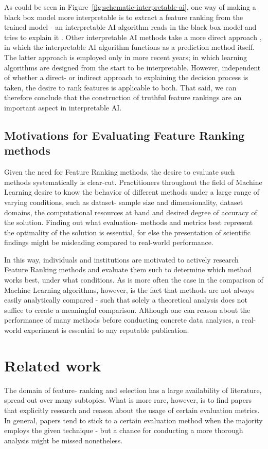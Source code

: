 \documentclass{article}
\begin{document}
As could be seen in Figure~\ref{fig:schematic-interpretable-ai}, one way of making a black box model more interpretable is to extract a feature ranking from the trained model - an interpretable AI algorithm reads in the black box model and tries to explain it \citep{lundberg_unified_2017}. Other interpretable AI methods take a more direct approach \citep{arik_tabnet_2020}, in which the interpretable AI algorithm functions as a prediction method itself. The latter approach is employed only in more recent years; in which learning algorithms are designed from the start to be interpretable. However, independent of whether a direct- or indirect approach to explaining the decision process is taken, the desire to rank features is applicable to both. That said, we can therefore conclude that the construction of truthful feature rankings are an important aspect in interpretable AI.

\subsection{Motivations for Evaluating Feature Ranking methods}
Given the need for Feature Ranking methods, the desire to evaluate such methods systematically is clear-cut. Practitioners throughout the field of Machine Learning desire to know the behavior of different methods under a large range of varying conditions, such as dataset- sample size and dimensionality, dataset domains, the computational resources at hand and desired degree of accuracy of the solution. Finding out what evaluation- methods and metrics best represent the optimality of the solution is essential, for else the presentation of scientific findings might be misleading compared to real-world performance.

In this way, individuals and institutions are motivated to actively research Feature Ranking methods and evaluate them such to determine which method works best, under what conditions. As is more often the case in the comparison of Machine Learning algorithms, however, is the fact that methods are not always easily analytically compared - such that solely a theoretical analysis does not suffice to create a meaningful comparison. Although one can reason about the performance of many methods before conducting concrete data analyses, a real-world experiment is essential to any reputable publication.

\section{Related work}\label{section:related work}
The domain of feature- ranking and selection has a large availability of literature, spread out over many subtopics. What is more rare, however, is to find papers that explicitly research and reason about the usage of certain evaluation metrics. In general, papers tend to stick to a certain evaluation method when the majority employs the given technique - but a chance for conducting a more thorough analysis might be missed nonetheless.
\end{document}
